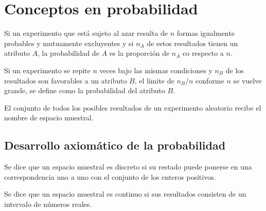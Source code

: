 \chapter{Conceptos en probabilidad}

\begin{tcolorbox}[colframe = white]
    \begin{def.} Si un experimento que está sujeto al azar resulta de $n$ formas igualmente probables y mutuamente excluyentes y si $n_A$ de estos resultados tienen un atributo $A$, la probabilidad de $A$ es la proporción de $n_A$ co respecto a $n$.
    \end{def.}
\end{tcolorbox}

\begin{tcolorbox}[colframe = white]
    \begin{def.} Si un experimento se repite $n$ veces bajo las mismas condiciones y $n_B$ de los resultados son favorables a un atributo $B$, el límite de $n_B/n$ conforme $n$ se vuelve grande, se define como la probabilidad del atributo $B$.
    \end{def.}
\end{tcolorbox}

\begin{tcolorbox}[colframe = white]
    \begin{def.} El conjunto de todos los posibles resultados de un experimento aleatorio recibe el nombre de espacio muestral.
    \end{def.}
\end{tcolorbox}

\setcounter{section}{4}
\section{Desarrollo axiomático de la probabilidad}

\begin{tcolorbox}[colframe = white]
    \begin{def.} Se dice que un espacio muestral es discreto si su restado puede ponerse en una correspondencia uno a uno con el conjunto de los enteros positivos.
    \end{def.}
\end{tcolorbox}

\begin{tcolorbox}[colframe = white]
    \begin{def.} Se dice que un espacio muestral es continuo si sus resultados consisten de un intervalo de números reales.
    \end{def.}
\end{tcolorbox}

